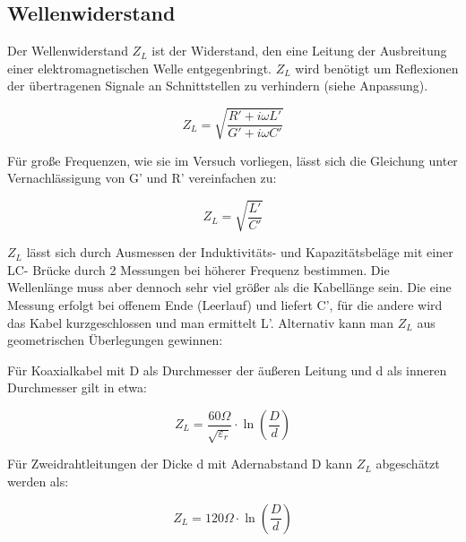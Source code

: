 	\cite{unterlagen}



\subsection{Wellenwiderstand} %
\label{sub:wellenwiderstand}

	Der Wellenwiderstand $Z_L$ ist der Widerstand, den eine Leitung der Ausbreitung einer elektromagnetischen Welle entgegenbringt.
	$Z_L$ wird benötigt um Reflexionen der übertragenen Signale an Schnittstellen zu verhindern (siehe Anpassung).

	\begin{equation}			
		Z_L = \sqrt{\dfrac{R' + i \omega L'}{G' + i \omega C'}}		
	\end{equation}

	Für große Frequenzen, wie sie im Versuch vorliegen, lässt sich die Gleichung unter Vernachlässigung von G' und R' vereinfachen zu:

	\begin{equation}			
		Z_L = \sqrt{\dfrac{L'}{C'}}		
	\end{equation}

	$Z_L$ lässt sich durch Ausmessen der Induktivitäts- und Kapazitätsbeläge mit einer LC- Brücke durch 2 Messungen bei höherer Frequenz bestimmen. 
	Die Wellenlänge muss aber dennoch sehr viel größer als die Kabellänge sein. 
	Die eine Messung erfolgt bei offenem Ende (Leerlauf) und liefert C', für die andere wird das Kabel kurzgeschlossen und man ermittelt L'. 
	Alternativ kann man $Z_L$ aus geometrischen Überlegungen gewinnen:

	Für Koaxialkabel mit D als Durchmesser der äußeren Leitung und d als inneren Durchmesser gilt in etwa:

	\begin{equation}		
		Z_L = \dfrac{60 \Omega}{\sqrt{\varepsilon_r}} \cdot \ln \left(\dfrac{D}{d}\right)		
	\end{equation}

	Für Zweidrahtleitungen der Dicke d mit Adernabstand D kann $Z_L$ abgeschätzt werden als:

	\begin{equation}			
		Z_L = 120 \Omega \cdot \ln\left(\dfrac{D}{d}\right)		
	\end{equation}

	\cite{unterlagen}


